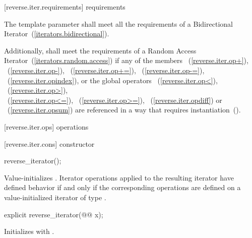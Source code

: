 \begin{removedblock}
[reverse.iter.requirements]{ requirements}

\pnum
The template parameter
shall meet all the requirements of a Bidirectional Iterator~(\ref{iterators.bidirectional}).

\pnum
Additionally,
shall meet the requirements of a Random Access Iterator~(\ref{iterators.random.access})
if any of the members
~(\ref{reverse.iter.op+}),
~(\ref{reverse.iter.op-}),
~(\ref{reverse.iter.op+=}),
~(\ref{reverse.iter.op-=}),
~(\ref{reverse.iter.opindex}),
or the global operators
~(\ref{reverse.iter.op<}),
~(\ref{reverse.iter.op>}),\\
~(\ref{reverse.iter.op<=}),
~(\ref{reverse.iter.op>=}),
~(\ref{reverse.iter.opdiff})
or
~(\ref{reverse.iter.opsum})
are referenced in a way that requires instantiation~().
\end{removedblock}

[reverse.iter.ops]{ operations}

[reverse.iter.cons]{ constructor}

%
\begin{itemdecl}
reverse_iterator();
\end{itemdecl}

\begin{itemdescr}
\pnum
\effects
Value-initializes
.
Iterator operations applied to the resulting iterator have defined behavior
if and only if the corresponding operations are defined on a
value-initialized iterator of type
.
\end{itemdescr}

%

\begin{itemdecl}
explicit reverse_iterator(@@ x);
\end{itemdecl}

\begin{itemdescr}
\pnum
\effects
Initializes
with .
\end{itemdescr}

